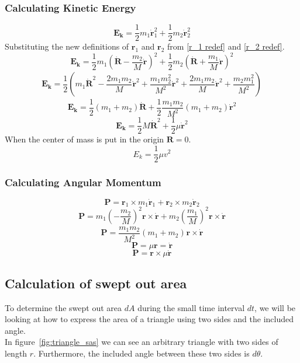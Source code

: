 \documentclass[reprint,english,notitlepage]{revtex4-2}
\begin{document}
		\subsubsection{Calculating Kinetic Energy}\label{E_k calc}
			\[
				\mathbf{E_k} = \frac{1}{2}m_1 \mathbf{\dot{r}}_{1}^{2} + \frac{1}{2}m_2 \mathbf{\dot{r}}_{2}^{2}
			\]
			Substituting the new definitions of $ \mathbf{r}_1 $ and $ \mathbf{r}_2 $ from \ref{r_1 redef} and  \ref{r_2 redef}.
			\[
			\mathbf{E_k} = \frac{1}{2} m_1 \left(\mathbf{\dot{R}} - \frac{m_2}{M}\mathbf{\dot{r}}\right)_{}^{2} + \frac{1}{2} m_2 \left(\mathbf{\dot{R}} + \frac{m_1}{M} \mathbf{\dot{r}}\right)_{}^{2}
			\]
			\[
			\mathbf{E_k} = \frac{1}{2} \left(m_1 \mathbf{\dot{R}}^{2} - \frac{2m_1 m_2}{M}\mathbf{\dot{r}}^{2} + \frac{m_1m_2^{2}}{M^{2}}\mathbf{\dot{r}}^{2} + \frac{2m_1m_2}{M}\mathbf{\dot{r}}^{2} + \frac{m_2m_1^{2}}{M^{2}}\right)_{}^{}
			\]
			\[
			\mathbf{E_k} = \frac{1}{2}\left( m_1 + m_2 \right) \mathbf{\dot{R}} + \frac{1}{2} \frac{m_1m_2}{M^{2}} \left( m_1+ m_2  \right) \mathbf{\dot{r}}^{2}
			\]
			\[
			\mathbf{E_k} = \frac{1}{2} M \mathbf{\dot{R}}^{2} + \frac{1}{2} μ \mathbf{\dot{r}}^{2}
			\]
			When the center of mass is put in the origin $ \mathbf{R} = 0 $.
			\[
			E_k = \frac{1}{2} \mu v^{2}
			\]


		\subsubsection{Calculating Angular Momentum}\label{AM calc}
			\[
			\mathbf{P} = \mathbf{r}_1 \times m_1 \mathbf{\dot{r}}_1 + \mathbf{r}_2 × m_2 \mathbf{\dot{r}}_2
			\]
			\[
			\mathbf{P} = m_1 \left(- \frac{m_2}{M}\right)_{}^{2}\mathbf{r} × \mathbf{\dot{r}} + m_2 \left(\frac{m_1}{M}\right)_{}^{2} \mathbf{r} × \mathbf{\dot{r}}
			\]
			\[
			\mathbf{P} = \frac{m_1m_2}{M^{2}} \left(m_1 + m_2\right)_{}^{} \mathbf{r} × \mathbf{\dot{r}} 
			\]
			\[
			\mathbf{P} = \mu \mathbf{r} = \mathbf{\dot{r}}
			\]
			\[
			\mathbf{P} = \mathbf{r} \times \mu \mathbf{\dot{r}}
			\]


\subsection{Calculation of swept out area}\label{subsec:calculation-of-swept-out-area}
    To determine the swept out area $dA$ during the small time interval $dt$, we will be looking at how to express the area of a triangle using two sides and the included angle.\\
	In figure~\ref{fig:triangle_sas} we can see an arbitrary triangle with two sides of length $r$.
	Furthermore, the included angle between these two sides is $d\theta$.\\
\end{document}

